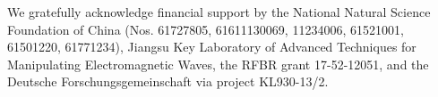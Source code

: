 \documentclass[aps,twocolumn,prb,showpacs,preprintnumbers,superscriptaddress,amsmath,amssymb,longbibliography]{revtex4-1}
\begin{document}

\acknowledgements
We gratefully acknowledge financial support by the National Natural Science Foundation of China (Nos. 61727805, 61611130069, 11234006, 61521001, 61501220, 61771234), Jiangsu Key Laboratory of Advanced Techniques for Manipulating Electromagnetic Waves, the RFBR grant 17-52-12051, and the Deutsche Forschungsgemeinschaft via project KL930-13/2.


\end{document}
